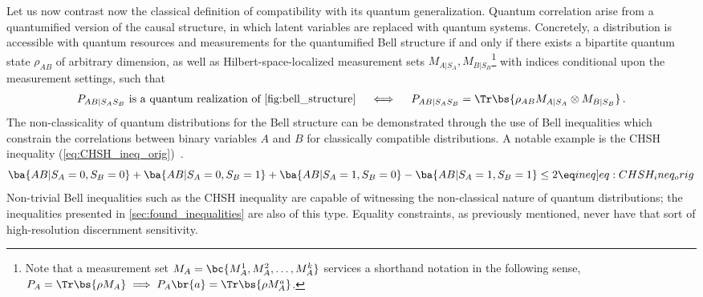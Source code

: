 \documentclass[aps, 10pt, english, twoside, pra, nofootinbib, tightenlines, longbibliography, superscriptaddress]{revtex4-1}
\begin{document}
    Let us now contrast now the classical definition of compatibility with its quantum generalization. Quantum correlation arise from a quantumified version of the causal structure, in which latent variables are replaced with quantum systems. Concretely, a distribution is accessible with quantum resources and measurements for the quantumified Bell structure if and only if there exists a bipartite quantum state $\rho_{AB}$ of arbitrary dimension, as well as Hilbert-space-localized measurement sets $M_{A|S_A}, M_{B|S_B}$\footnote{Note that a measurement set $M_{A} = \bc{M_{A}^{1}, M_{A}^{2}, \ldots, M_{A}^{k}}$ services a shorthand notation in the following sense, $\prob[A] = \Tr\bs{\rho M_{A}} \implies \prob[A]\br{a} = \Tr\bs{\rho M_{A}^{a}}$.} with indices conditional upon the measurement settings, such that
    \begin{align}\label{eq:bellQcompat}
    \prob[AB|S_AS_B] \text{ is a quantum realization of \cref{fig:bell_structure}} \quad\iff\quad\prob[AB|S_AS_B] = \Tr\bs{\rho_{AB}M_{A|S_A}\otimes M_{B|S_B}}\,.
    \end{align}
    The non-classicality of quantum distributions for the Bell structure can be demonstrated through the use of Bell inequalities which constrain the correlations between binary variables $A$ and $B$ for classically compatible distributions. A notable example is the CHSH inequality (\cref{eq:CHSH_ineq_orig})~\cite{CHSH_Original}.
    \[ \ba{AB | S_{A} = 0, S_{B} = 0} + \ba{AB | S_{A} = 0, S_{B} = 1} + \ba{AB | S_{A} = 1, S_{B} = 0} - \ba{AB | S_{A} = 1, S_{B} = 1} \leq 2 \eq \label[ineq]{eq:CHSH_ineq_orig} \]
    Non-trivial Bell inequalities such as the CHSH inequality are capable of witnessing the non-classical nature of quantum distributions; the inequalities presented in \cref{sec:found_inequalities} are also of this type. Equality constraints, as previously mentioned, never have that sort of high-resolution discernment sensitivity.

\end{document}

